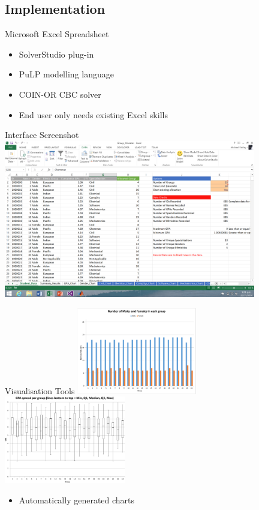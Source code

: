 \documentclass{beamer}
\begin{document}
\subsection{Implementation}
\begin{frame}{Microsoft Excel Spreadsheet}
\begin{itemize}
  \item SolverStudio plug-in
  \item PuLP modelling language
  \item COIN-OR CBC solver
  \item End user only needs existing Excel skills
\end{itemize}
\end{frame}
\begin{frame}{Interface Screenshot}
\centering
\includegraphics[width=11cm]{screenshot.png}
\end{frame}
\begin{frame}{Visualisation Tools}
\centering
\includegraphics[height=3.8cm]{bar_chart.pdf}
\hfill
\includegraphics[height=3.8cm]{gpa.pdf}
\begin{itemize}
\item Automatically generated charts
\end{itemize}
\end{frame}
\end{document}
